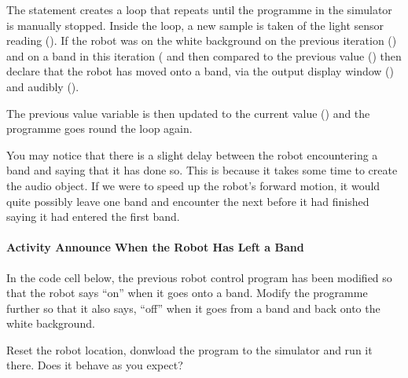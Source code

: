 \documentclass[letterpaper,10pt,english]{sphinxmanual}
\begin{document}
The  statement creates a loop that repeats until the programme in the simulator is manually stopped. Inside the loop, a new sample is taken of the light sensor reading (). If the robot was on the white background on the previous iteration () and on a band in this iteration ( and then compared to the previous value () then declare that the robot has moved onto a band, via the output
display window () and audibly ().

The previous value variable is then updated to the current value () and the programme goes round the loop again.

You may notice that there is a slight delay between the robot encountering a band and saying that it has done so. This is because it takes some time to create the audio object. If we were to speed up the robot’s forward motion, it would quite possibly leave one band and encounter the next before it had finished saying it had entered the first band.



\paragraph{Activity \sphinxhyphen{} Announce When the Robot Has Left a Band}
\label{\detokenize{content/00_SOFTWARE_GUIDE/Section_00_03_quick_practical_tour:Activity---Announce-When-the-Robot-Has-Left-a-Band}}
In the code cell below, the previous robot control program has been modified so that the robot says “on” when it goes onto a band. Modify the programme further so that it also says, “off” when it goes from a band and back onto the white background.

Reset the robot location, donwload the program to the simulator and run it there. Does it behave as you expect?
\end{document}
